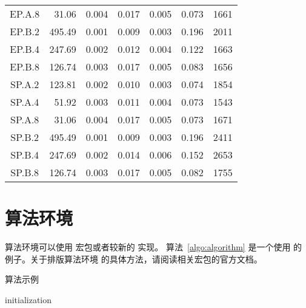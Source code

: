 \documentclass{sjtureport}
\begin{document}
\begin{ThreePartTable}
\begin{longtable}[c]{c*{6}{r}}
		EP.A.8           & 31.06                      & 0.004                      & 0.017 & 0.005 & 0.073 & 1661   \\
		EP.B.2           & 495.49                     & 0.001                      & 0.009 & 0.003 & 0.196 & 2011   \\
		EP.B.4           & 247.69                     & 0.002                      & 0.012 & 0.004 & 0.122 & 1663   \\
		EP.B.8           & 126.74                     & 0.003                      & 0.017 & 0.005 & 0.083 & 1656   \\
		SP.A.2           & 123.81                     & 0.002                      & 0.010 & 0.003 & 0.074 & 1854   \\
		SP.A.4           & 51.92                      & 0.003                      & 0.011 & 0.004 & 0.073 & 1543   \\
		SP.A.8           & 31.06                      & 0.004                      & 0.017 & 0.005 & 0.073 & 1671   \\
		SP.B.2           & 495.49                     & 0.001                      & 0.009 & 0.003 & 0.196 & 2411   \\
		SP.B.4 \tnote{a} & 247.69                     & 0.002                      & 0.014 & 0.006 & 0.152 & 2653   \\
		SP.B.8 \tnote{b} & 126.74                     & 0.003                      & 0.017 & 0.005 & 0.082 & 1755   \\
		\bottomrule
	\end{longtable}
\end{ThreePartTable}

\section{算法环境}

算法环境可以使用  宏包或者较新的  实现。
算法~\ref{algo:algorithm} 是一个使用  的例子。关于排版算法环境
的具体方法，请阅读相关宏包的官方文档。

\begin{algorithm}[htb]
	\caption{算法示例}
	\label{algo:algorithm}
	\small
	\SetAlgoLined

	initialization\;
\end{algorithm}
\end{document}

